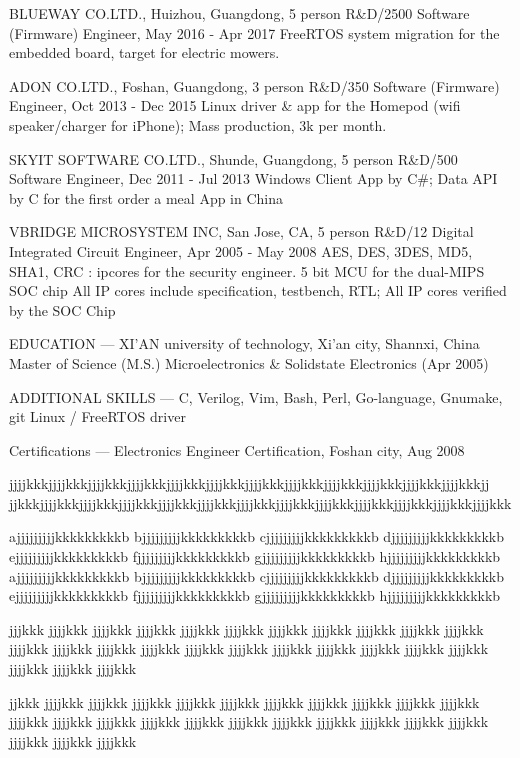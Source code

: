 BLUEWAY CO.LTD., Huizhou, Guangdong, 5 person R\&D/2500
Software (Firmware) Engineer, May 2016 - Apr 2017
 FreeRTOS system migration for the embedded board, target for electric mowers.

ADON CO.LTD., Foshan, Guangdong, 3 person R\&D/350
Software (Firmware) Engineer, Oct 2013 - Dec 2015
 Linux driver \& app for the Homepod (wifi speaker/charger for iPhone); Mass production, 3k per month.

SKYIT SOFTWARE CO.LTD., Shunde, Guangdong, 5 person R\&D/500
Software Engineer, Dec 2011 - Jul 2013
 Windows Client App by C\#; Data API by C for the first order a meal App in China

VBRIDGE MICROSYSTEM INC, San Jose, CA, 5 person R\&D/12
Digital Integrated Circuit Engineer, Apr 2005 - May 2008
 AES, DES, 3DES, MD5, SHA1, CRC : ipcores for the security engineer. 
 5 bit MCU for the dual-MIPS SOC chip
 All IP cores include specification, testbench, RTL; All IP cores verified by the SOC Chip

EDUCATION
---
XI'AN university of technology, Xi'an city, Shannxi, China
Master of Science (M.S.) Microelectronics \& Solidstate Electronics (Apr 2005)

ADDITIONAL SKILLS
---
 C, Verilog, Vim, Bash, Perl, Go-language, Gnumake, git
 Linux / FreeRTOS driver

Certifications
---
Electronics Engineer Certification, Foshan city, Aug 2008

jjjjkkkjjjjkkkjjjjkkkjjjjkkkjjjjkkkjjjjkkkjjjjkkkjjjjkkkjjjjkkkjjjjkkkjjjjkkkjjjjkkkjj
jjkkkjjjjkkkjjjjkkkjjjjkkkjjjjkkkjjjjkkkjjjjkkkjjjjkkkjjjjkkkjjjjkkkjjjjkkkjjjjkkkjjjjkkk

ajjjjjjjjjkkkkkkkkkb
bjjjjjjjjjkkkkkkkkkb
cjjjjjjjjjkkkkkkkkkb
djjjjjjjjjkkkkkkkkkb
ejjjjjjjjjkkkkkkkkkb
fjjjjjjjjjkkkkkkkkkb
gjjjjjjjjjkkkkkkkkkb
hjjjjjjjjjkkkkkkkkkb
ajjjjjjjjjkkkkkkkkkb
bjjjjjjjjjkkkkkkkkkb
cjjjjjjjjjkkkkkkkkkb
djjjjjjjjjkkkkkkkkkb
ejjjjjjjjjkkkkkkkkkb
fjjjjjjjjjkkkkkkkkkb
gjjjjjjjjjkkkkkkkkkb
hjjjjjjjjjkkkkkkkkkb

jjjkkk jjjjkkk jjjjkkk jjjjkkk jjjjkkk jjjjkkk jjjjkkk jjjjkkk jjjjkkk jjjjkkk jjjjkkk jjjjkkk jjjjkkk jjjjkkk jjjjkkk jjjjkkk jjjjkkk jjjjkkk jjjjkkk jjjjkkk jjjjkkk jjjjkkk jjjjkkk jjjjkkk jjjjkkk

jjkkk jjjjkkk jjjjkkk jjjjkkk jjjjkkk jjjjkkk jjjjkkk jjjjkkk jjjjkkk jjjjkkk jjjjkkk jjjjkkk jjjjkkk jjjjkkk jjjjkkk jjjjkkk jjjjkkk jjjjkkk jjjjkkk jjjjkkk jjjjkkk jjjjkkk jjjjkkk jjjjkkk jjjjkkk

